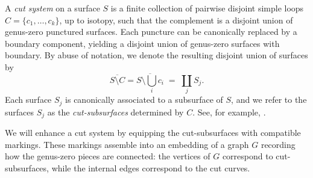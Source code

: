 \documentclass{amsart}
\newcommand{\mrnote}[1]{\marginpar{\RaggedRight\tiny{\color{red}#1}}}
\newcommand{\lbnote}[1]{\marginpar{\RaggedRight\tiny{\color{blue}#1}}}
\theoremstyle{definition}
\numberwithin{equation}{section}
\begin{document}
A \emph{cut system} on a surface $S$ is a finite collection of pairwise disjoint simple loops $C=\{c_1,\ldots,c_k\}$, up to isotopy, such that the complement is a disjoint union of genus-zero punctured surfaces. Each puncture can be canonically replaced by a boundary component, yielding a disjoint union of genus-zero surfaces with boundary. By abuse of notation, we denote the resulting disjoint union of surfaces by
\[
\overline{S\setminus C}=\overline{S\setminus \bigcup_i c_i} \;=\; \coprod_j S_j.
\]
Each surface $S_j$ is canonically associated to a subsurface of $S$, and we refer to the surfaces $S_j$ as the \emph{cut-subsurfaces} determined by $C$. See, for example, \cite{Hatcher_Thurston,hls,moore1989classical}. 

We will enhance a cut system by equipping the cut-subsurfaces with compatible markings. These markings assemble into an embedding of a graph $G$ recording how the genus-zero pieces are connected: the vertices of $G$ correspond to cut-subsurfaces, while the internal edges correspond to the cut curves.
\end{document}
